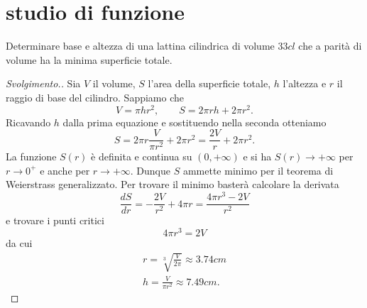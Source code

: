 \section{studio di funzione}

\begin{exercise}
%
%
Determinare base e altezza di una lattina cilindrica di volume $33 cl$
che a parità di volume ha la minima superficie totale.
\end{exercise}
\begin{proof}[Svolgimento.]
Sia $V$ il volume, $S$ l'area della superficie totale, $h$ l'altezza e $r$
il raggio di base del cilindro.
Sappiamo che
\[
  V = \pi h r^2, \qquad
  S = 2\pi r h + 2 \pi r^2.
\]
Ricavando $h$ dalla prima equazione e sostituendo nella seconda otteniamo
\[
  S = 2 \pi r \frac{V}{\pi r^2} + 2 \pi r^2
    = \frac{2V}{r} + 2 \pi r^2.
\]
La funzione $S(r)$ è definita e continua su $(0,+\infty)$
e si ha $S(r)\to +\infty$ per $r\to 0^+$
e anche per $r\to +\infty$. 
Dunque $S$ ammette minimo per il teorema di Weierstrass
generalizzato.
Per trovare il minimo basterà calcolare la derivata
\[
 \frac{dS}{dr} = -\frac{2V}{r^2} + 4 \pi r = \frac{4\pi r^3 - 2V}{r^2}
\]
e trovare i punti critici
\[
  4\pi r^3 = 2V
\]
da cui
\begin{align*}
 r = \sqrt[3]{\frac{V}{2\pi}} \approx 3.74 cm\\
 h = \frac{V}{\pi r^2} \approx 7.49 cm.
\end{align*}
\end{proof}

